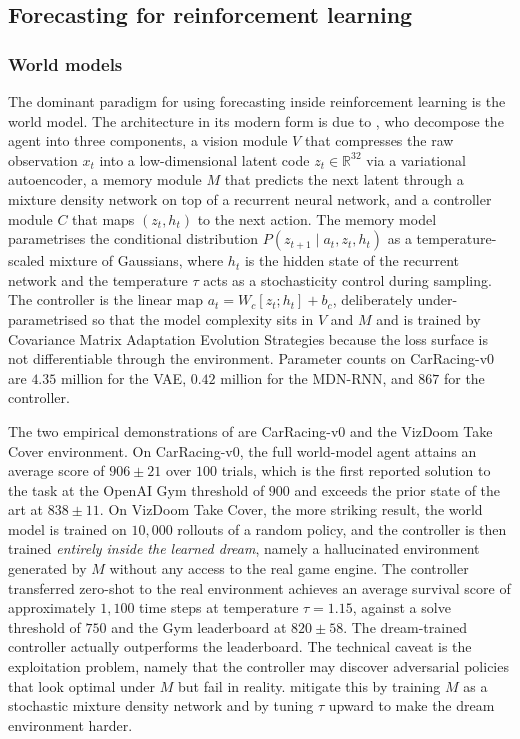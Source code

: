 \subsection{Forecasting for reinforcement learning}
\label{sec:forecasting_for_rl}

\subsubsection{World models}
\label{sec:world_models}

The dominant paradigm for using forecasting inside reinforcement learning is the
world model. The architecture in its modern form is due to \citet{HaSchmidhuber2018},
who decompose the agent into three components, a vision module $V$ that compresses
the raw observation $x_t$ into a low-dimensional latent code $z_t \in \mathbb R^{32}$
via a variational autoencoder, a memory module $M$ that predicts the next latent
through a mixture density network on top of a recurrent neural network, and a
controller module $C$ that maps $(z_t, h_t)$ to the next action. The memory model
parametrises the conditional distribution
$P(z_{t+1} \mid a_t, z_t, h_t)$ as a temperature-scaled mixture of Gaussians, where
$h_t$ is the hidden state of the recurrent network and the temperature $\tau$ acts
as a stochasticity control during sampling. The controller is the linear map
$a_t = W_c [z_t; h_t] + b_c$, deliberately under-parametrised so that the model
complexity sits in $V$ and $M$ and is trained by Covariance Matrix Adaptation
Evolution Strategies because the loss surface is not differentiable through the
environment. Parameter counts on CarRacing-v0 are $4.35$ million for the VAE,
$0.42$ million for the MDN-RNN, and $867$ for the controller.

The two empirical demonstrations of \citet{HaSchmidhuber2018} are CarRacing-v0 and
the VizDoom Take Cover environment. On CarRacing-v0, the full world-model agent
attains an average score of $906 \pm 21$ over $100$ trials, which is the first
reported solution to the task at the OpenAI Gym threshold of $900$ and exceeds the
prior state of the art at $838 \pm 11$. On VizDoom Take Cover, the more striking
result, the world model is trained on $10{,}000$ rollouts of a random policy, and
the controller is then trained \emph{entirely inside the learned dream}, namely a
hallucinated environment generated by $M$ without any access to the real game
engine. The controller transferred zero-shot to the real environment achieves an
average survival score of approximately $1{,}100$ time steps at temperature
$\tau = 1.15$, against a solve threshold of $750$ and the Gym leaderboard at
$820 \pm 58$. The dream-trained controller actually outperforms the leaderboard.
The technical caveat is the exploitation problem, namely that the controller may
discover adversarial policies that look optimal under $M$ but fail in reality.
\citet{HaSchmidhuber2018} mitigate this by training $M$ as a stochastic mixture
density network and by tuning $\tau$ upward to make the dream environment harder.

